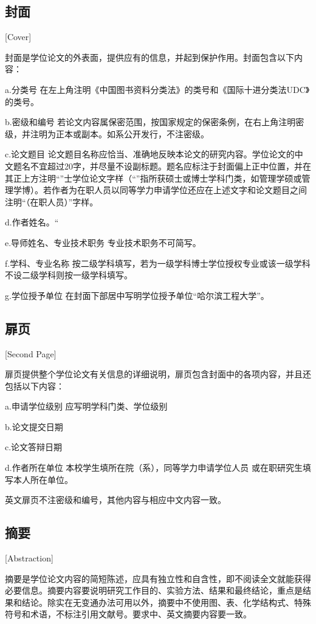 \subsection{封面}[Cover]

封面是学位论文的外表面，提供应有的信息，并起到保护作用。封面包含以下内容：

a.分类号 \quad 在左上角注明《中国图书资料分类法》的类号和《国际十进分类法UDC》的类号。

b.密级和编号 \quad 若论文内容属保密范围，按国家规定的保密条例，在右上角注明密级，并注明为正本或副本。如系公开发行，不注密级。

c.论文题目 \quad 论文题目名称应恰当、准确地反映本论文的研究内容。学位论文的中文题名不宜超过20字，并尽量不设副标题。题名应标注于封面偏上正中位置，并在其正上方注明“\uline{\qquad}”士学位论文字样（“\uline{\qquad}”指所获硕士或博士学科门类，如管理学硕或管理学博）。若作者为在职人员以同等学力申请学位还应在上述文字和论文题目之间注明“（在职人员）”字样。

d.作者姓名。“

e.导师姓名、专业技术职务 \quad 专业技术职务不可简写。

f.学科、专业名称 \quad 按二级学科填写，若为一级学科博士学位授权专业或该一级学科不设二级学科则按一级学科填写。

g.学位授予单位 \quad 在封面下部居中写明学位授予单位“哈尔滨工程大学”。

\subsection{扉页}[Second Page]

扉页提供整个学位论文有关信息的详细说明，扉页包含封面中的各项内容，并且还包括以下内容：

a.申请学位级别 \quad 应写明学科门类、学位级别

b.论文提交日期

c.论文答辩日期

d.作者所在单位 \quad 本校学生填所在院（系），同等学力申请学位人员
或在职研究生填写本人所在单位。

英文扉页不注密级和编号，其他内容与相应中文内容一致。

\subsection{摘要}[Abstraction]

摘要是学位论文内容的简短陈述，应具有独立性和自含性，即不阅读全文就能获得必要信息。摘要内容要说明研究工作目的、实验方法、结果和最终结论，重点是结果和结论。除实在无变通办法可用以外，摘要中不使用图、表、化学结构式、特殊符号和术语，不标注引用文献号。要求中、英文摘要内容要一致。


